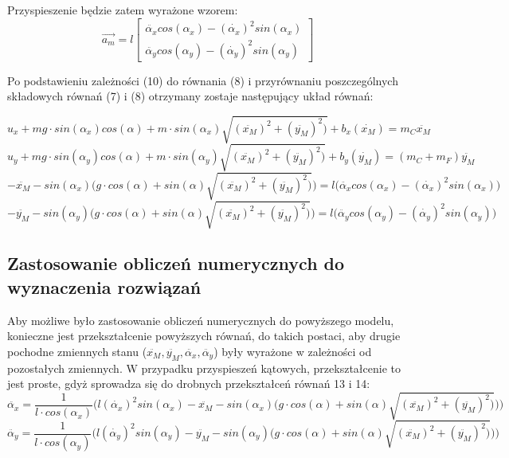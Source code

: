\documentclass[10pt]{article}
\begin{document}
Przyspieszenie będzie zatem wyrażone wzorem:
\begin{equation}
\vec{a_m} = l
\begin{bmatrix}
\ddot{\alpha_x} cos(\alpha_x) - (\dot{\alpha_x})^2 sin(\alpha_x) \\
\ddot{\alpha_y} cos(\alpha_y) - (\dot{\alpha_y})^2 sin(\alpha_y)
\end{bmatrix}
\end{equation}

Po podstawieniu zależności (10) do równania (8) i przyrównaniu poszczególnych składowych równań (7) i (8) otrzymany zostaje następujący układ równań:

\begin{equation}
u_x + mg \cdot sin(\alpha_x) cos(\alpha) + m \cdot sin(\alpha_x) \sqrt{(\ddot{x_M})^2 + (\ddot{y_M})^2)} + b_x(\dot{x_M}) = m_C \ddot{x_M}
\end{equation}
\begin{equation}
u_y + mg \cdot sin(\alpha_y) cos(\alpha) + m \cdot sin(\alpha_y) \sqrt{(\ddot{x_M})^2 + (\ddot{y_M})^2)} + b_y(\dot{y_M}) = (m_C + m_F) \ddot{y_M}
\end{equation}
\begin{equation}
-\ddot{x_M}-sin(\alpha_x) \Big( g \cdot cos(\alpha) + sin(\alpha)\sqrt{(\ddot{x_M})^2 + (\ddot{y_M})^2)} \Big) = l \big( \ddot{\alpha_x} cos(\alpha_x) - (\dot{\alpha_x})^2 sin(\alpha_x) \big)
\end{equation}
\begin{equation}
-\ddot{y_M}-sin(\alpha_y) \Big( g \cdot cos(\alpha) + sin(\alpha)\sqrt{(\ddot{x_M})^2 + (\ddot{y_M})^2)} \Big) = l \big( \ddot{\alpha_y} cos(\alpha_y) - (\dot{\alpha_y})^2 sin(\alpha_y) \big)
\end{equation}

\newpage
\subsection*{Zastosowanie obliczeń numerycznych do wyznaczenia rozwiązań}
Aby możliwe było zastosowanie obliczeń numerycznych do powyższego modelu, konieczne jest przekształcenie powyższych równań, do takich postaci, aby drugie pochodne zmiennych stanu ($\ddot{x_M}, \ddot{y_M}, \ddot{\alpha_x}, \ddot{\alpha_y}$) były wyrażone w zależności od pozostałych zmiennych. W przypadku przyspieszeń kątowych, przekształcenie to jest proste, gdyż sprowadza się do drobnych przekształceń równań 13 i 14:
\begin{equation}
\ddot{\alpha_x} = \frac{1}{l \cdot cos(\alpha_x)} \bigg(l (\dot{\alpha_x})^2 sin(\alpha_x) - \ddot{x_M}-sin(\alpha_x) \Big( g \cdot cos(\alpha) + sin(\alpha)\sqrt{(\ddot{x_M})^2 + (\ddot{y_M})^2)} \Big) \bigg)
\end{equation}
\begin{equation}
\ddot{\alpha_y} = \frac{1}{l \cdot cos(\alpha_y)} \bigg(l (\dot{\alpha_y})^2 sin(\alpha_y) - \ddot{y_M}-sin(\alpha_y) \Big( g \cdot cos(\alpha) + sin(\alpha)\sqrt{(\ddot{x_M})^2 + (\ddot{y_M})^2)} \Big) \bigg)
\end{equation}
\end{document}
